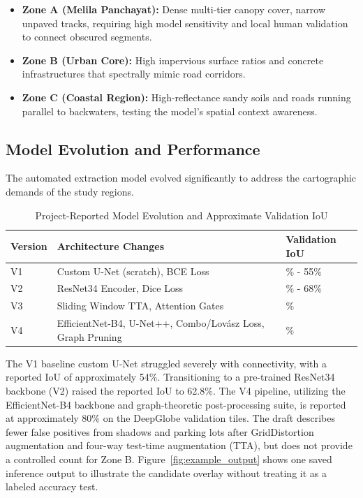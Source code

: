 \documentclass[10pt,a4paper,twocolumn]{article}
\begin{document}
\begin{itemize}
    \item \textbf{Zone A (Melila Panchayat):} Dense multi-tier canopy cover, narrow unpaved tracks, requiring high model sensitivity and local human validation to connect obscured segments.
    \item \textbf{Zone B (Urban Core):} High impervious surface ratios and concrete infrastructures that spectrally mimic road corridors.
    \item \textbf{Zone C (Coastal Region):} High-reflectance sandy soils and roads running parallel to backwaters, testing the model's spatial context awareness.
\end{itemize}

\subsection{Model Evolution and Performance}
The automated extraction model evolved significantly to address the cartographic demands of the study regions. 

\begin{table}[t]
\caption{Project-Reported Model Evolution and Approximate Validation IoU}
\begin{center}
\begin{tabularx}{\linewidth}{>{\hsize=0.4\hsize\raggedright\arraybackslash}X >{\hsize=1.2\hsize\raggedright\arraybackslash}X >{\hsize=0.4\hsize\raggedright\arraybackslash}X}
\toprule
\textbf{Version} & \textbf{Architecture Changes} & \textbf{Validation IoU} \\
\midrule
V1 & Custom U-Net (scratch), BCE Loss & 54\% - 55\% \\
\addlinespace
V2 & ResNet34 Encoder, Dice Loss & 62.8\% - 68\% \\
\addlinespace
V3 & Sliding Window TTA, Attention Gates & 75\% \\
\addlinespace
V4 & EfficientNet-B4, U-Net++, Combo/Lov\'{a}sz Loss, Graph Pruning & 80\% \\
\bottomrule
\end{tabularx}
\label{tab:model_evol}
\end{center}
\end{table}

The V1 baseline custom U-Net struggled severely with connectivity, with a reported IoU of approximately 54\%. Transitioning to a pre-trained ResNet34 backbone (V2) raised the reported IoU to 62.8\%. The V4 pipeline, utilizing the EfficientNet-B4 backbone and graph-theoretic post-processing suite, is reported at approximately 80\% on the DeepGlobe validation tiles. The draft describes fewer false positives from shadows and parking lots after GridDistortion augmentation and four-way test-time augmentation (TTA), but does not provide a controlled count for Zone B. Figure~\ref{fig:example_output} shows one saved inference output to illustrate the candidate overlay without treating it as a labeled accuracy test.
\end{document}

